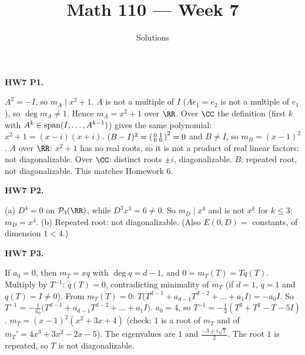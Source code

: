 \documentclass[10pt]{scrartcl}
\title{Math 110 --- Week 7}
\subtitle{Solutions}
\author{}\date{}\ihead{}
\begin{document}
\maketitle
\begin{prob}
\textbf{HW7 P1. }\par 
{}
\begin{enumerate}[(a)]
  \ii $A^2=-I$, so $m_A\mid x^2+1$. $A$ is not a multiple of $I$ ($Ae_1=e_2$ is not a multiple of $e_1$), so $\deg m_A\ne1$. Hence $m_A=x^2+1$ over $\RR$. Over $\CC$ the definition (first $k$ with $A^k\in\operatorname{span}(I,\dots,A^{k-1})$) gives the same polynomial: $x^2+1=(x-i)(x+i)$.
  \ii $(B-I)^2=\begin{psmallmatrix}0&1\\0&0\end{psmallmatrix}^2=0$ and $B\ne I$, so $m_B=(x-1)^2$.
  \ii $A$ over $\RR$: $x^2+1$ has no real roots, so it is not a product of real linear factors: not diagonalizable. Over $\CC$: distinct roots $\pm i$, diagonalizable. $B$: repeated root, not diagonalizable. This matches Homework 6.
\end{enumerate}
\end{prob}

\begin{prob}
\textbf{HW7 P2. }\par 
{}
(a) $D^4=0$ on $\PP_3(\RR)$, while $D^3x^3=6\ne0$. So $m_D\mid x^4$ and is not $x^k$ for $k\le3$: $m_D=x^4$. (b) Repeated root: not diagonalizable. (Also $E(0,D)=$ constants, of dimension $1<4$.)
\end{prob}

\begin{prob}
\textbf{HW7 P3. }\par 
\begin{enumerate}[(a)]
  \ii {}
  If $a_0=0$, then $m_T=xq$ with $\deg q=d-1$, and $0=m_T(T)=Tq(T)$. Multiply by $T^{-1}$: $q(T)=0$, contradicting minimality of $m_T$ (if $d=1$, $q=1$ and $q(T)=I\ne0$).
  \ii {}
  From $m_T(T)=0$: $T\big(T^{d-1}+a_{d-1}T^{d-2}+\dots+a_1I\big)=-a_0I$. So $T^{-1}=-\frac1{a_0}\big(T^{d-1}+a_{d-1}T^{d-2}+\dots+a_1I\big)$.
  \ii {}
  $a_0=4$, so $T^{-1}=-\frac14(T^3+T^2-T-5I)$. $m_T=(x-1)^2(x^2+3x+4)$ (check: $1$ is a root of $m_T$ and of $m_T'=4x^3+3x^2-2x-5$). The eigenvalues are $1$ and $\frac{-3\pm i\sqrt7}2$. The root $1$ is repeated, so $T$ is not diagonalizable.
\end{enumerate}
\end{prob}
\end{document}

